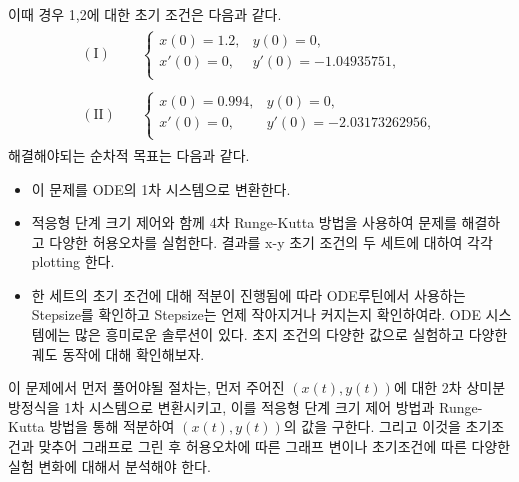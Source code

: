 \documentclass[11pt]{article}
\begin{document}
이때 경우 1,2에 대한 초기 조건은 다음과 같다.
\begin{equation}
\begin{split}
\begin{aligned}
(\mathrm{I}) \quad &\left\{
\begin{array}{l}
x(0) = 1.2, & y(0) = 0, \\
x'(0) = 0, & y'(0) = -1.04935751, \\
\end{array}
\right.
\\\\
(\mathrm{II}) \quad &\left\{
\begin{array}{l}
x(0) = 0.994, & y(0) = 0, \\
x'(0) = 0, & y'(0) = -2.03173262956, \\
\end{array}
\right.
\end{aligned}
\end{split}
\end{equation}
해결해야되는 순차적 목표는 다음과 같다.
\begin{itemize}
\item 이 문제를 ODE의 1차 시스템으로 변환한다.
\item 적응형 단계 크기 제어와 함께 4차 Runge-Kutta 방법을 사용하여 문제를 해결하고 다양한 허용오차를 실험한다. 결과를 x-y 초기 조건의 두 세트에 대하여 각각 plotting 한다.
\item 한 세트의 초기 조건에 대해 적분이 진행됨에 따라 ODE루틴에서 사용하는 Stepsize를 확인하고 Stepsize는 언제 작아지거나 커지는지 확인하여라.
 ODE 시스템에는 많은 흥미로운 솔루션이 있다. 초지 조건의 다양한 값으로 실험하고 다양한 궤도 동작에 대해 확인해보자.
\end{itemize}
이 문제에서 먼저 풀어야될 절차는,  먼저 주어진 $(x(t), y(t))$에 대한 2차 상미분 방정식을 1차 시스템으로 변환시키고, 이를 적응형 단계 크기 제어 방법과 Runge-Kutta 방법을 통해 적분하여 $(x(t), y(t))$의 값을 구한다. 그리고 이것을 초기조건과 맞추어 그래프로 그린 후 허용오차에 따른 그래프 변이나 초기조건에 따른 다양한 실험 변화에 대해서 분석해야 한다.
\end{document}
